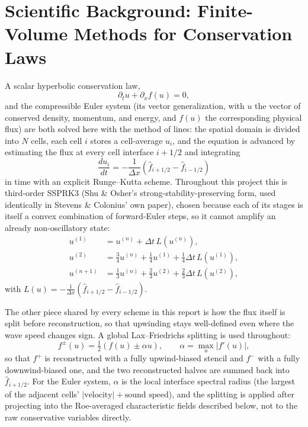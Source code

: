 \documentclass[11pt]{article}
\begin{document}
\section{Scientific Background: Finite-Volume Methods for Conservation Laws}
\label{sec:background-fv}

A scalar hyperbolic conservation law,
\[
\partial_t u + \partial_x f(u) = 0,
\]
and the compressible Euler system (its vector generalization, with $u$ the
vector of conserved density, momentum, and energy, and $f(u)$ the
corresponding physical flux) are both solved here with the method of lines:
the spatial domain is divided into $N$ cells, each cell $i$ stores a
cell-average $u_i$, and the equation is advanced by estimating the flux at
every cell interface $i+1/2$ and integrating
\[
\frac{d u_i}{dt} = -\frac{1}{\Delta x}\left(\hat f_{i+1/2} - \hat f_{i-1/2}\right)
\]
in time with an explicit Runge--Kutta scheme. Throughout this project this
is third-order SSPRK3 (Shu \& Osher's strong-stability-preserving form,
used identically in Stevens \& Colonius' own paper), chosen because each of
its stages is itself a convex combination of forward-Euler steps, so it
cannot amplify an already non-oscillatory state:
\begin{align*}
u^{(1)} &= u^{(n)} + \Delta t\, L(u^{(n)}), \\
u^{(2)} &= \tfrac{3}{4}u^{(n)} + \tfrac{1}{4}u^{(1)} + \tfrac{1}{4}\Delta t\, L(u^{(1)}), \\
u^{(n+1)} &= \tfrac{1}{3}u^{(n)} + \tfrac{2}{3}u^{(2)} + \tfrac{2}{3}\Delta t\, L(u^{(2)}),
\end{align*}
with $L(u) = -\frac{1}{\Delta x}(\hat f_{i+1/2} - \hat f_{i-1/2})$.

The other piece shared by every scheme in this report is how the flux
itself is split before reconstruction, so that upwinding stays well-defined
even where the wave speed changes sign. A global Lax--Friedrichs splitting
is used throughout:
\[
f^{\pm}(u) = \tfrac{1}{2}\left(f(u) \pm \alpha u\right), \qquad
\alpha = \max_u \left|f'(u)\right|,
\]
so that $f^+$ is reconstructed with a fully upwind-biased stencil and
$f^-$ with a fully downwind-biased one, and the two reconstructed halves
are summed back into $\hat f_{i+1/2}$. For the Euler system, $\alpha$ is
the local interface spectral radius (the largest of the adjacent cells'
$|\text{velocity}| + \text{sound speed}$), and the splitting is applied
after projecting into the Roe-averaged characteristic fields described
below, not to the raw conservative variables directly.
\end{document}
